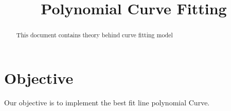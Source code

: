\documentclass[journal,12pt,twocolumn]{IEEEtran}
\begin{document}
\makeatletter
{}
\makeatother
\let\StandardTheFigure\thefigure
\let\vec\mathbf
\renewcommand{\thefigure}{\theproblem}
\def\putbox#1#2#3{\makebox[0in][l]{\makebox[#1][l]{}\raisebox{\baselineskip}[0in][0in]{\raisebox{#2}[0in][0in]{#3}}}}
     \def\rightbox#1{\makebox[0in][r]{#1}}
     \def\centbox#1{\makebox[0in]{#1}}
     \def\topbox#1{\raisebox{-\baselineskip}[0in][0in]{#1}}
\vspace{3cm}
\title{Polynomial Curve Fitting}
\maketitle
\newpage
\bigskip
\renewcommand{\thefigure}{\theenumi}
\renewcommand{\thetable}{\theenumi}
\begin{abstract}
This document contains theory behind curve fitting model
\end{abstract}
\section{\textbf{Objective}}
Our objective is to implement the best fit line  polynomial Curve.
\end{document}
